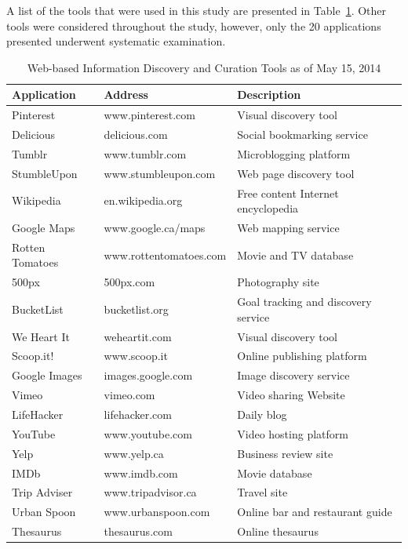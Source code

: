 \documentclass{sigchi}
\begin{document}
{A list of the tools that were used in this study are presented in Table~\ref{table:tools}. Other tools were considered throughout the study, however, only the 20 applications presented underwent systematic examination. 

\begin{table}[htbp]
\small
\begin{tabular}{|p{}| p{}| p{}|}

\hline
\textbf{Application} & \textbf{Address} & \textbf{Description}
\\
\hline
Pinterest       & www.pinterest.com 	& Visual discovery tool \\
\hline
Delicious       & delicious.com 		& Social bookmarking service \\
\hline
Tumblr          & www.tumblr.com 		& Microblogging platform \\
\hline
StumbleUpon     & www.stumbleupon.com  	& Web page discovery tool \\
\hline
Wikipedia       & en.wikipedia.org   	& Free content Internet encyclopedia\\
\hline
Google Maps     & www.google.ca/maps  	& Web mapping service\\
\hline
Rotten Tomatoes & www.rottentomatoes.com & Movie and TV database\\
\hline
500px           & 500px.com            	& Photography site\\
\hline
BucketList      & bucketlist.org  		& Goal tracking and discovery service\\
\hline
We Heart It     & weheartit.com 		& Visual discovery tool \\
\hline
Scoop.it!       & www.scoop.it 			& Online publishing platform \\
\hline
Google Images   & images.google.com  	& Image discovery service \\
\hline
Vimeo           & vimeo.com  			& Video sharing Website\\
\hline
LifeHacker      & lifehacker.com        & Daily blog \\
\hline
YouTube         & www.youtube.com 		& Video hosting platform \\
\hline
Yelp            & www.yelp.ca  			& Business review site\\
\hline
IMDb            & www.imdb.com  		& Movie database \\
\hline
Trip Adviser    & www.tripadvisor.ca 	& Travel site \\
\hline
Urban Spoon     & www.urbanspoon.com    & Online bar and restaurant guide\\
\hline
Thesaurus       & thesaurus.com         & Online thesaurus \\
\hline
\end{tabular}
\caption{Web-based Information Discovery and Curation Tools as of May 15, 2014}
\label{table:tools} 
\end{table}
} %
\end{document}
